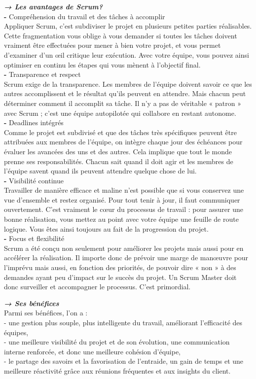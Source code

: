 \textbf{\textit{→ Les avantages de Scrum? }}\\
	\textbf{-} Compréhension du travail et des tâches à accomplir \\
	Appliquer Scrum, c’est subdiviser le projet en plusieurs petites parties réalisables. Cette fragmentation vous oblige à vous demander si toutes les tâches doivent vraiment être effectuées pour mener à bien votre projet, et vous permet d’examiner d’un œil critique leur exécution. Avec votre équipe, vous pouvez ainsi optimiser en continu les étapes qui vous mènent à l’objectif final. \\
	\textbf{-} Transparence et respect  \\
	Scrum exige de la transparence. Les membres de l’équipe doivent savoir ce que les autres accomplissent et le résultat qu’ils peuvent en attendre. Mais chacun peut déterminer comment il accomplit sa tâche. Il n’y a pas de véritable « patron » avec Scrum ; c’est une équipe autopilotée qui collabore en restant autonome.\\
	\textbf{-} Deadlines intégrés  \\
	Comme le projet est subdivisé et que des tâches très spécifiques peuvent être attribuées aux membres de l’équipe, on intègre chaque jour des échéances pour évaluer les avancées des uns et des autres. Cela implique que tout le monde prenne ses responsabilités. Chacun sait quand il doit agir et les membres de l’équipe savent quand ils peuvent attendre quelque chose de lui.\\
	\textbf{-} Visibilité continue \\
Travailler de manière efficace et maline n’est possible que si vous conservez une vue d’ensemble et restez organisé. Pour tout tenir à jour, il faut communiquer ouvertement. C’est vraiment le cœur du processus de travail : pour assurer une bonne réalisation, vous mettez au point avec votre équipe une feuille de route logique. Vous êtes ainsi toujours au fait de la progression du projet. \\
	\textbf{-} Focus et flexibilité \\
Scrum a été conçu non seulement pour améliorer les projets mais aussi pour en accélérer la réalisation. Il importe donc de prévoir une marge de manœuvre pour l’imprévu mais aussi, en fonction des priorités, de pouvoir dire « non » à des demandes ayant peu d’impact sur le succès du projet. Un Scrum Master doit donc surveiller et accompagner le processus. C’est primordial.

\textbf{\textit{→ Ses bénéfices }}\\
Parmi ses bénéfices, l’on a : \\
	- une gestion plus souple, plus intelligente du travail, améliorant l’efficacité des équipes, \\
	- une meilleure visibilité du projet et de son évolution,
une communication interne renforcée, et donc une meilleure cohésion d’équipe, \\
	- le partage des savoirs et la favorisation de l’entraide,
un gain de temps et une meilleure réactivité grâce aux réunions fréquentes et aux insights du client.


